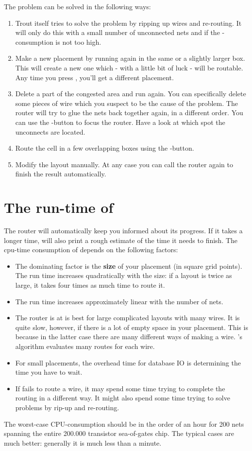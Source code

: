 The problem can be solved in the following ways:
\begin{enumerate}
\item
Trout itself tries to solve the problem by ripping up 
wires and re-routing. It will only do this with a small number
of unconnected nets and if the -consumption is not too high.
\item
Make a new placement by running  again in the
same or a slightly larger box. This will create a new one
which - with a little bit of luck - will be routable. Any time you press
, you'll get a different placement.
\item
Delete a part of the congested area and run 
again.  You can specifically delete some pieces of wire
which you suspect to be the cause of the problem.  The
router will try to glue the nets back together again, in a
different order.  You can use the -button
to focus the router.  Have a look at which spot the
unconnects are located.
\item
Route the cell in a few overlapping boxes using the
-button.
\item
Modify the layout manually. At any case you can call the
router again to finish the result automatically.
\end{enumerate}

\section{The run-time of \protect{}}
The router will automatically keep you informed about its progress. If it
takes a longer time,  will also print a rough estimate of the time
it needs to finish. The cpu-time consumption of  depends on the
following factors:
\begin{itemize}
\item
The dominating factor is the {\bf size} of your placement (in square
grid points).  The run time increases quadratically with the size: if a layout
is twice as large, it takes four times as much time to route it.
\item
The run time increases approximately linear with the number of nets.
\item
The router is at is best for large complicated layouts with many wires. It is
quite slow, however, if there is a lot of empty space in your placement. This
is because in the latter case there are many different ways of making a wire.
's algorithm evaluates many routes for each wire.
\item
For small placements, the overhead time for database IO is 
determining the time you have to wait.
\item
If  fails to route a wire, it may spend some time trying to
complete the routing in a different way. It might also spend some time trying
to solve problems by rip-up and re-routing.
\end{itemize}
The worst-case CPU-consumption should be in the order of an hour for 200 nets
spanning the entire 200.000 transistor sea-of-gates chip. The typical cases are
much better: generally it is much less than a minute.


